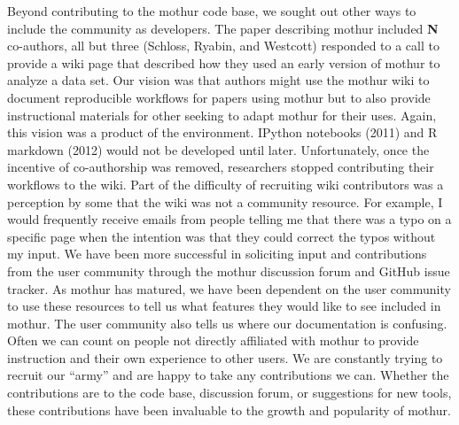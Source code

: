 \documentclass[11pt,]{article}
\begin{document}
Beyond contributing to the mothur code base, we sought out other ways to
include the community as developers. The paper describing mothur
included \textbf{N} co-authors, all but three (Schloss, Ryabin, and
Westcott) responded to a call to provide a wiki page that described how
they used an early version of mothur to analyze a data set. Our vision
was that authors might use the mothur wiki to document reproducible
workflows for papers using mothur but to also provide instructional
materials for other seeking to adapt mothur for their uses. Again, this
vision was a product of the environment. IPython notebooks (2011) and R
markdown (2012) would not be developed until later. Unfortunately, once
the incentive of co-authorship was removed, researchers stopped
contributing their workflows to the wiki. Part of the difficulty of
recruiting wiki contributors was a perception by some that the wiki was
not a community resource. For example, I would frequently receive emails
from people telling me that there was a typo on a specific page when the
intention was that they could correct the typos without my input. We
have been more successful in soliciting input and contributions from the
user community through the mothur discussion forum and GitHub issue
tracker. As mothur has matured, we have been dependent on the user
community to use these resources to tell us what features they would
like to see included in mothur. The user community also tells us where
our documentation is confusing. Often we can count on people not
directly affiliated with mothur to provide instruction and their own
experience to other users. We are constantly trying to recruit our
``army'' and are happy to take any contributions we can. Whether the
contributions are to the code base, discussion forum, or suggestions for
new tools, these contributions have been invaluable to the growth and
popularity of mothur.
\end{document}
